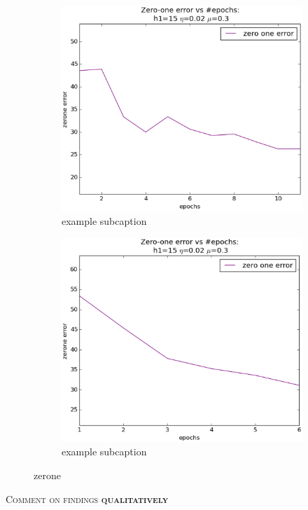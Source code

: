 \begin{figure}[!ht]
	\quad
	\begin{subfigure}[b]{.45\textwidth}
	\centering
	\includegraphics[width=\textwidth]{mlp/plots/zerone_optimize_4_9.eps}
	\caption{example subcaption}
	\label{fig:4_9_tuned_zerone}
	\end{subfigure}
	\quad
	\begin{subfigure}[b]{.45\textwidth}
	\centering
	\includegraphics[width=\textwidth]{mlp/plots/zerone_optimize_3_5.eps}
	\caption{example subcaption}
	\label{fig:3_5_tuned_zerone}
	\end{subfigure}

	\caption{zerone}
	\label{fig:binary_subtasks}
\end{figure}
\textsc{Comment on findings \textbf{qualitatively}}		

